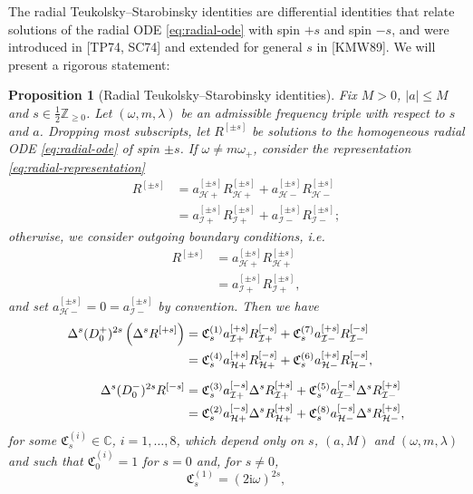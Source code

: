 \documentclass[11pt]{article}
\newtheorem{proposition}{Proposition}[section]
\newcommand{\ii}{\mathrm{i}}
\newcommand{\cH}{\mathcal H}
\newcommand{\cI}{\mathcal I}
\numberwithin{equation}{section}
\begin{document}
The radial Teukolsky--Starobinsky identities are differential identities that relate solutions of the  radial ODE \eqref{eq:radial-ode} with spin $+s$ and spin $-s$, and were introduced in [TP74, SC74] and extended for general $s$ in [KMW89]. We will present a rigorous statement:

\begin{proposition}[Radial Teukolsky--Starobinsky identities]\label{prop:radial-ts}
Fix $M>0$, $|a|\leq M$ and $s\in \frac12\mathbb Z_{\geq0}$. Let $(\omega,m,\lambda)$ be an admissible frequency triple with respect to $s$ and $a$. Dropping most subscripts, let $R^{[\pm s]}$ be solutions to the homogeneous radial ODE \eqref{eq:radial-ode} of spin $\pm s$. If $\omega\neq m\omega_+$, consider the representation \eqref{eq:radial-representation}
\begin{align*}
R^{[\pm s]}&=a^{[\pm s]}_{\cH+}R^{[\pm s]}_{\cH+}
       +a^{[\pm s]}_{\cH-}R^{[\pm s]}_{\cH-} \\
&=a^{[\pm s]}_{\cI+}R^{[\pm s]}_{\cI+}
       +a^{[\pm s]}_{\cI-}R^{[\pm s]}_{\cI-};
\end{align*}
otherwise, we consider outgoing boundary conditions, i.e.\
\begin{align*}
R^{[\pm s]}&=a^{[\pm s]}_{\cH+}R^{[\pm s]}_{\cH+}\\
&=a^{[\pm s]}_{\cI+}R^{[\pm s]}_{\cI+},
\end{align*}
and set $a^{[\pm s]}_{\cH-}=0=a^{[\pm s]}_{\cI-}$ by convention. Then we have
\begin{align}
\Delta^s(D^+_0)^{2s}\left(\Delta^s R^{[+s]}\right)
&=\mathfrak C^{(1)}_s a^{[+s]}_{\cI+}R^{[-s]}_{\cI+}
  +\mathfrak C^{(7)}_s a^{[+s]}_{\cI-}R^{[-s]}_{\cI-} \notag\\
&=\mathfrak C^{(4)}_sa^{[+s]}_{\cH+}R^{[-s]}_{\cH+}
  +\mathfrak C^{(6)}_sa^{[+s]}_{\cH-}R^{[-s]}_{\cH-},
\notag\\[2mm]
\Delta^s(D^-_0)^{2s}R^{[-s]}
&=\mathfrak C^{(3)}_s a^{[-s]}_{\cI+}\Delta^sR^{[+s]}_{\cI+}
  +\mathfrak C^{(5)}_s a^{[-s]}_{\cI-}\Delta^sR^{[+s]}_{\cI-} \notag\\
&=\mathfrak C^{(2)}_sa^{[-s]}_{\cH+}\Delta^sR^{[+s]}_{\cH+}
  +\mathfrak C^{(8)}_sa^{[-s]}_{\cH-}\Delta^sR^{[+s]}_{\cH-},
\label{eq:TS-identities}
\end{align}
for some $\mathfrak C^{(i)}_s\in\mathbb C$, $i=1,\dots,8$, which depend only on $s$, $(a,M)$ and $(\omega,m,\lambda)$ and such that $\mathfrak C^{(i)}_0=1$ for $s=0$ and, for $s\neq 0$,
\begin{equation*}
        \mathfrak C^{(1)}_s=(2\ii\omega)^{2s},

\end{equation*}
\end{proposition}
\end{document}
